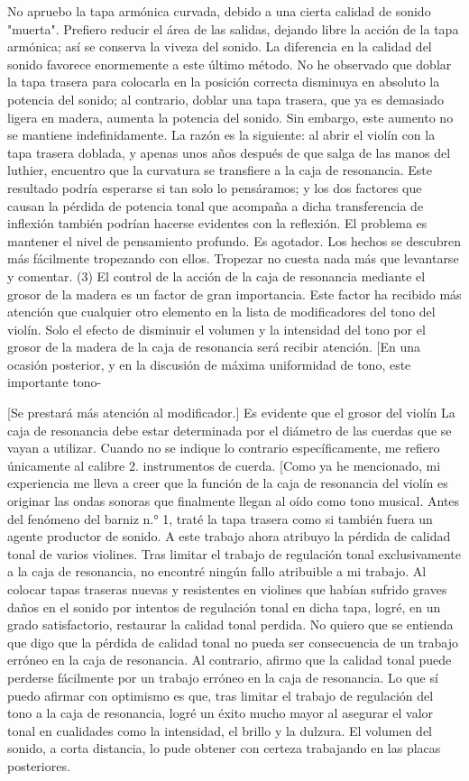 No apruebo la tapa armónica curvada, debido a una cierta calidad de sonido "muerta". Prefiero reducir el área de las salidas, dejando libre la acción de la tapa armónica; así se conserva la viveza del sonido. La diferencia en la calidad del sonido favorece enormemente a este último método.
No he observado que doblar la tapa trasera para colocarla en la posición correcta disminuya en absoluto la potencia del sonido; al contrario, doblar una tapa trasera, que ya es demasiado ligera en madera, aumenta la potencia del sonido. Sin embargo, este aumento no se mantiene indefinidamente. La razón es la siguiente: al abrir el violín con la tapa trasera doblada, y apenas unos años después de que salga de las manos del luthier, encuentro que la curvatura se transfiere a la caja de resonancia.
Este resultado podría esperarse si tan solo lo pensáramos; y los dos factores que causan la pérdida de potencia tonal que acompaña a dicha transferencia de inflexión también podrían hacerse evidentes con la reflexión. El problema es mantener el nivel de pensamiento profundo. Es agotador. Los hechos se descubren más fácilmente tropezando con ellos. Tropezar no cuesta nada más que levantarse y comentar.
(3) El control de la acción de la caja de resonancia mediante el grosor de la madera es un factor de gran importancia. Este factor ha recibido más atención que cualquier otro elemento en la lista de modificadores del tono del violín. Solo el efecto de disminuir el volumen y la intensidad del tono por el grosor de la madera de la caja de resonancia será
recibir atención. [En una ocasión posterior, y en la discusión de
máxima uniformidad de tono, este importante tono-


[Se prestará más atención al modificador.] Es evidente que el grosor del violín
La caja de resonancia debe estar determinada por el diámetro de las cuerdas que se vayan a utilizar. Cuando no se indique lo contrario específicamente, me refiero únicamente al calibre 2.
instrumentos de cuerda.
[Como ya he mencionado, mi experiencia me lleva a creer que la función de la caja de resonancia del violín es originar las ondas sonoras que finalmente llegan al oído como tono musical. Antes del fenómeno del barniz n.° 1, traté la tapa trasera como si también fuera un agente productor de sonido. A este trabajo ahora atribuyo la pérdida de calidad tonal de varios violines. Tras limitar el trabajo de regulación tonal exclusivamente a la caja de resonancia, no encontré ningún fallo atribuible a mi trabajo. Al colocar tapas traseras nuevas y resistentes en violines que habían sufrido graves daños en el sonido por intentos de regulación tonal en dicha tapa, logré, en un grado satisfactorio, restaurar la calidad tonal perdida. No quiero que se entienda que digo que la pérdida de calidad tonal no pueda ser consecuencia de un trabajo erróneo en la caja de resonancia. Al contrario, afirmo que la calidad tonal puede perderse fácilmente por un trabajo erróneo en la caja de resonancia. Lo que sí puedo afirmar con optimismo es que, tras limitar el trabajo de regulación del tono a la caja de resonancia, logré un éxito mucho mayor al asegurar el valor tonal en cualidades como la intensidad, el brillo y la dulzura. El volumen del sonido, a corta distancia, lo pude obtener con certeza trabajando en las placas posteriores.


